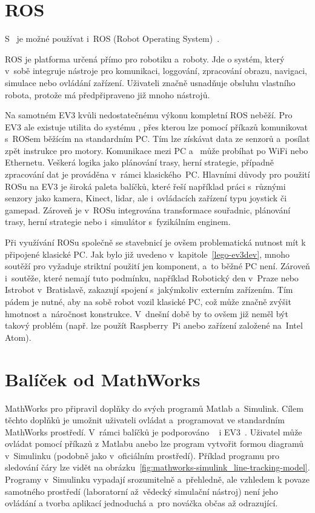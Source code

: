 \section{ROS}

S~\legoEV{} je možné používat i~ROS (Robot Operating System)~\cite{legoProgramingPlatform_ROS}. 

ROS je platforma určená přímo pro robotiku a~roboty. 
Jde o systém, který v~sobě integruje nástroje pro komunikaci, loggování, zpracování obrazu, navigaci, simulace nebo ovládání zařízení. 
Uživateli značně usnadňuje obsluhu vlastního robota, protože má předpřipraveno již mnoho nástrojů.

Na samotném EV3 kvůli nedostatečnému výkonu   kompletní ROS neběží.
Pro EV3 ale existuje utilita do systému \evThreeDev{}, přes kterou lze pomocí příkazů komunikovat s~ROSem běžícím na standardním PC. 
Tím lze získávat data ze senzorů a~posílat zpět instrukce pro motory. 
Komunikace mezi PC a~ může probíhat po WiFi nebo Ethernetu.
Veškerá logika jako plánování trasy, herní strategie, případně zpracování dat je prováděna v~rámci klasického~PC.
Hlavními důvody pro použití ROSu na EV3 je široká paleta balíčků, které řeší například práci s~různými senzory jako kamera, Kinect, lidar, ale i~ovládacích zařízení typu joystick či gamepad. 
Zároveň je v~ROSu integrována transformace souřadnic, plánování trasy, herní strategie nebo i~simulátor s~fyzikálním enginem.


Při využívání ROSu společně se stavebnicí \lego{} je ovšem problematická nutnost mít k~ připojené klasické PC. 
Jak bylo již uvedeno v~kapitole~\ref{lego-ev3dev}, mnoho soutěží pro \legoM{} vyžaduje striktní použití jen \lego{} komponent, a~to běžné PC není. 
Zároveň i~soutěže, které nemají tuto podmínku, například Robotický den v~Praze nebo Istrobot v~Bratislavě, zakazují spojení s~jakýmkoliv externím zařízením.
Tím pádem je nutné, aby na sobě \lego{} robot vozil klasické PC, což může značně zvýšit hmotnost a~náročnost konstrukce. 
V~dnešní době by to ovšem již neměl být takový problém (např. lze použít Raspberry~Pi anebo zařízení založené na~Intel Atom).

\section{Balíček od MathWorks}
\label{lego-alternative-soft_mathworks}

MathWorks pro \legoM{} připravil doplňky do svých programů Matlab a~Simulink. 
Cílem těchto doplňků je umožnit uživateli ovládat a~programovat \legoM{} ve standardním MathWorks prostředí. 
V~rámci balíčků je podporováno \legoNXT~\cite{legoProgramingPlatform_MathWork-NXT} i EV3~\cite{legoProgramingPlatform_MathWork-EV3}.
Uživatel může ovládat \brick{} pomocí příkazů z Matlabu anebo lze program vytvořit formou diagramů v~Simulinku (podobně jako v~oficiálním \lego{} prostředí). 
Příklad programu pro sledování čáry lze vidět na obrázku~\ref{fig:mathworks-simulink_line-tracking-model}.
Programy v~Simulinku vypadají srozumitelně a~přehledně, ale vzhledem k povaze samotného prostředí (laboratorní až~vědecký simulační nástroj) není jeho ovládání a tvorba aplikací jednoduchá a~pro nováčka občas až odrazující. 

